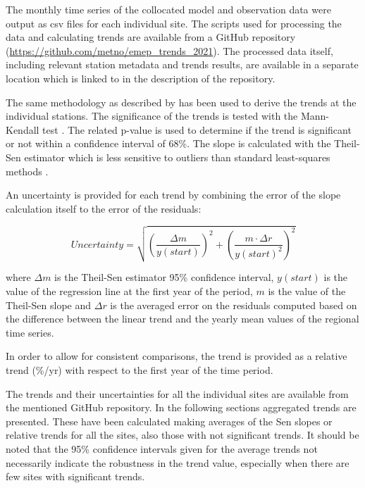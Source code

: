 The monthly time series of the collocated model and observation data were output as csv files for each individual site. The scripts used for processing the data and calculating trends are available from a GitHub repository (\url{https://github.com/metno/emep_trends_2021}). The processed data itself, including relevant station metadata and trends results, are available in a separate location which is linked to in the description of the repository.

The same methodology as described by \cite{aas2019global, mortier2020} has been used to derive the trends at the individual stations. The significance of the trends is tested with the Mann-Kendall test \citep{hamed1998modified}. The related p-value is used to determine if the trend is significant or not within a confidence interval of 68\%. The slope is calculated with the Theil-Sen estimator which is less sensitive to outliers than standard least-squares methods \citep{sen1968estimates}.

An uncertainty is provided for each trend by combining the error of the slope calculation itself to the error of the residuals:

\begin{equation}
 Uncertainty = \sqrt{{\left (\frac{\Delta m}{y(start)}\right )}^{2} + {\left ( \frac{m \cdot \Delta r}{y(start)^2}\right )}^{2} }
\end{equation}

where $\Delta m$ is the Theil-Sen estimator 95\% confidence interval, $y(start)$ is the value of the regression line at the first year of the period, $m$ is the value of the Theil-Sen slope and $\Delta r$ is the averaged error on the residuals computed based on the difference between the linear trend and the yearly mean values of the regional time series.

In order to allow for consistent comparisons, the trend is provided as a relative trend (\%/yr) with respect to the first year of the time period.

The trends and their uncertainties for all the individual sites are available from the mentioned GitHub repository. In the following sections aggregated trends are presented. These have been calculated making averages of the Sen slopes or relative trends for all the sites, also those with not significant trends. It should be noted that the 95\% confidence intervals given for the average trends not necessarily indicate the robustness in the trend value, especially when there are few sites with significant trends.


